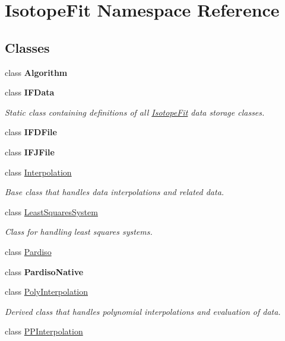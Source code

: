 \hypertarget{namespace_isotope_fit}{}\section{Isotope\+Fit Namespace Reference}
\label{namespace_isotope_fit}
\subsection*{Classes}
\begin{DoxyCompactItemize}
\item 
class {\bfseries Algorithm}
\item 
class {\bfseries I\+F\+Data}
\begin{DoxyCompactList}\small\item\em Static class containing definitions of all \mbox{\hyperlink{namespace_isotope_fit}{Isotope\+Fit}} data storage classes. \end{DoxyCompactList}\item 
class {\bfseries I\+F\+D\+File}
\item 
class {\bfseries I\+F\+J\+File}
\item 
class \mbox{\hyperlink{class_isotope_fit_1_1_interpolation}{Interpolation}}
\begin{DoxyCompactList}\small\item\em Base class that handles data interpolations and related data. \end{DoxyCompactList}\item 
class \mbox{\hyperlink{class_isotope_fit_1_1_least_squares_system}{Least\+Squares\+System}}
\begin{DoxyCompactList}\small\item\em Class for handling least squares systems. \end{DoxyCompactList}\item 
class \mbox{\hyperlink{class_isotope_fit_1_1_pardiso}{Pardiso}}
\item 
class {\bfseries Pardiso\+Native}
\item 
class \mbox{\hyperlink{class_isotope_fit_1_1_poly_interpolation}{Poly\+Interpolation}}
\begin{DoxyCompactList}\small\item\em Derived class that handles polynomial interpolations and evaluation of data. \end{DoxyCompactList}\item 
class \mbox{\hyperlink{class_isotope_fit_1_1_p_p_interpolation}{P\+P\+Interpolation}}

\end{DoxyCompactItemize}
